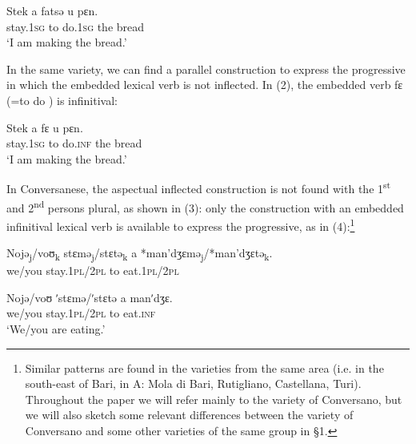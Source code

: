 \documentclass[output=paper]{langsci/langscibook}
\begin{document}
\ea%
    \label{ex:lorusso:1}
    \gll Stek    a   fatsə    u    pɛn.     \\
         stay.\textsc{1sg}   to  do.\textsc{1sg} the    bread\\
    \glt ‘I am making the bread.’
    \z


In the same variety, we can find a parallel construction to express the progressive in which the embedded lexical verb is not inflected. In (2), the embedded verb fɛ (=to do ) is infinitival: 

\ea%
    \label{ex:lorusso:2}
    \gll Stek     a  fɛ     u    pɛn.      \\
         stay.\textsc{1sg} to   do.\textsc{inf}    the    bread\\
    \glt ‘I am making the bread.’
    \z

In Conversanese, the aspectual inflected construction is not found with the 1\textsuperscript{st} and 2\textsuperscript{nd} persons plural, as shown in (3): only the construction with an embedded infinitival lexical verb is available to express the progressive, as in (4):\footnote{Similar patterns are found in the varieties from the same area (i.e. in the south-east of Bari, in A: Mola di Bari, Rutigliano, Castellana, Turi). Throughout the paper we will refer mainly to the variety of Conversano, but we will also sketch some relevant differences between the variety of Conversano and some other varieties of the same group in §1.}

\ea%
    \label{ex:lorusso:3}
    \gll Nojə\textsubscript{j}/voʊ\textsubscript{k}   stɛmə\textsubscript{j}/stɛtə\textsubscript{k}   a   *man’dʒɛmə\textsubscript{j}/*man’dʒɛtə\textsubscript{k}.\\
         we/you  stay.\textsc{1pl}/\textsc{2pl} to   eat.\textsc{1pl}/\textsc{2pl} \\
    \z


\ea%
    \label{ex:lorusso:4}
    \gll Nojə/voʊ   ʹstɛmə/ʹstɛtə   a  manʹdʒɛ.\\
         we/you   stay.\textsc{1pl}/\textsc{2pl} to   eat.\textsc{inf}\\
    \glt ‘We/you are eating.’
    \z
\end{document}
